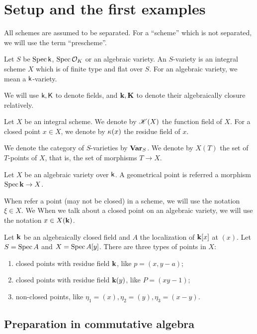 \section{Setup and the first examples}

    All schemes are assumed to be separated.
    For a ``scheme'' which is not separated, we will use the term ``prescheme''.
 
    Let $S$ be $\operatorname{Spec} \mathsf{k}$, $\operatorname{Spec} \mathcal{O}_K$ or an algebraic variety.
    An $S$-variety is an integral scheme $X$ which is of finite type and flat over $S$.
    For an algebraic variety, we mean a $\mathsf{k}$-variety.

    We will use $\mathsf{k},\mathsf{K}$ to denote fields, and $\mathbf{k},\mathbf{K}$ to denote their algebraically closure relatively.

    Let $X$ be an integral scheme.
    We denote by $\mathscr{K}(X)$ the function field of $X$.
    For a closed point $x \in X$, we denote by $\kappa(x)$ the residue field of $x$.

    We denote the category of $S$-varieties by $\mathbf{Var}_S$.
    We denote by $X(T)$ the set of $T$-points of $X$, that is, the set of morphisms $T \to X$.

    Let $X$ be an algebraic variety over $\mathsf{k}$.
    A geometrical point is referred a morphism $\operatorname{Spec} \mathbf{k} \to X$.

    When refer a point (may not be closed) in a scheme, we will use the notation $\xi \in X$.
    We 
    When we talk about a closed point on an algebraic variety, we will use the notation $x \in X(\mathbf{k})$.


\begin{example}
    Let $\mathbf{k}$ be an algebraically closed field and $A$ the localization of $\mathbf{k}[x]$ at $(x)$.
    Let $S = \operatorname{Spec} A$ and $X = \operatorname{Spec} A[y]$. 
    There are three types of points in $X$:
    \begin{enumerate}[label=(\roman*)]
        \item closed points with residue field $\mathbf{k}$, like $p = (x,y-a)$;
        \item closed points with residue field $\mathbf{k}(y)$, like $P = (xy-1)$;
        \item non-closed points, like $\eta_1 = (x),\eta_2 = (y),\eta_3 = (x-y)$.
    \end{enumerate}

\end{example}

    \subsection{Preparation in commutative algebra}

